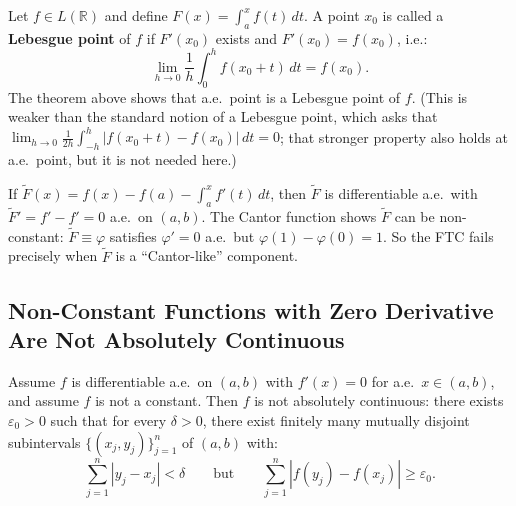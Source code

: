 \documentclass[11pt]{report}
\begin{document}
\begin{defbox}
Let $f \in L(\mathbb{R})$ and define $F(x) = \int_a^x f(t)\,dt$. A point $x_0$ is called a \textbf{Lebesgue point} of $f$ if $F'(x_0)$ exists and $F'(x_0) = f(x_0)$, i.e.:
\[
\lim_{h \to 0} \frac{1}{h}\int_0^h f(x_0 + t)\,dt = f(x_0).
\]
The theorem above shows that a.e.\ point is a Lebesgue point of $f$. (This is weaker than the standard notion of a Lebesgue point, which asks that $\lim_{h \to 0} \frac{1}{2h}\int_{-h}^{h} |f(x_0 + t) - f(x_0)|\,dt = 0$; that stronger property also holds at a.e.\ point, but it is not needed here.)
\end{defbox}

\begin{rembox}
If $\tilde{F}(x) = f(x) - f(a) - \int_a^x f'(t)\,dt$, then $\tilde{F}$ is differentiable a.e.\ with $\tilde{F}' = f' - f' = 0$ a.e.\ on $(a,b)$. The Cantor function shows $\tilde{F}$ can be non-constant: $\tilde{F} \equiv \varphi$ satisfies $\varphi' = 0$ a.e.\ but $\varphi(1) - \varphi(0) = 1$. So the FTC fails precisely when $\tilde{F}$ is a ``Cantor-like'' component.
\end{rembox}

\subsection{Non-Constant Functions with Zero Derivative Are Not Absolutely Continuous}

\begin{thmbox}
Assume $f$ is differentiable a.e.\ on $(a, b)$ with $f'(x) = 0$ for a.e.\ $x \in (a, b)$, and assume $f$ is not a constant. Then $f$ is not absolutely continuous: there exists $\varepsilon_0 > 0$ such that for every $\delta > 0$, there exist finitely many mutually disjoint subintervals $\{(x_j, y_j)\}_{j=1}^{n}$ of $(a, b)$ with:
\[
\sum_{j=1}^{n} |y_j - x_j| < \delta \qquad \text{but} \qquad \sum_{j=1}^{n} |f(y_j) - f(x_j)| \geq \varepsilon_0.
\]
\end{thmbox}
\end{document}
